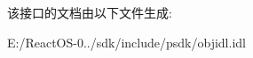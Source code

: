 该接口的文档由以下文件生成\+:\begin{DoxyCompactItemize}
\item 
E\+:/\+React\+O\+S-\/0../sdk/include/psdk/objidl.\+idl\end{DoxyCompactItemize}
